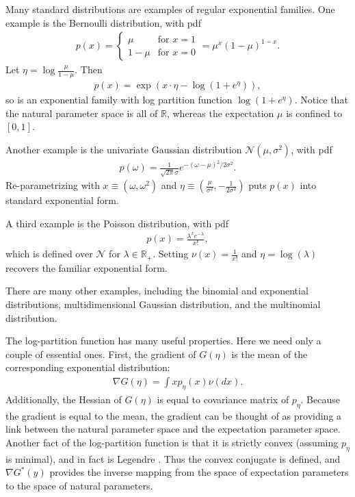 \documentclass{article}
\newcommand{\R}{\mathbb{R}}
\newcommand{\N}{\mathcal{N}}
\begin{document}
Many standard distributions are examples of regular exponential
families.  One example is the Bernoulli distribution, with
pdf 
\begin{align*}
p(x) = \left\{\begin{array}{cc} \mu & \mbox{for }x=1\\
1-\mu & \mbox{for } x=0
\end{array} \right. = \mu^x(1-\mu)^{1-x}.
\end{align*}
Let $\eta = \log\frac{\mu}{1-\mu}$.  Then 
\begin{align*}
p(x) = \exp(x\cdot\eta - \log(1+e^{\eta})),
\end{align*}
so is an exponential family with log partition function
$\log(1+e^{\eta})$.  Notice that the natural parameter space is all of
$\R$, whereas the expectation $\mu$ is confined to $[0,1]$.  

Another example is the univariate Gaussian distribution
$\N(\mu,\sigma^2)$, with pdf 
\begin{align*}
p(\omega) = \frac{1}{\sqrt{2\pi}\sigma}e^{-(\omega-\mu)^2/2\sigma^2}.
\end{align*} 
Re-parametrizing with $x\equiv (\omega,\omega^2)$ and $\eta \equiv
(\frac{\mu}{\sigma^2},-\frac{1}{2\sigma^2})$ puts $p(x)$ into standard
exponential form.  

A third example is the Poisson distribution, with pdf 
\begin{align*}
p(x) = \frac{\lambda^xe^{-\lambda}}{x!},
\end{align*}
which is defined over $\N$ for $\lambda\in\R_+$.  Setting $\nu(x) =
\frac{1}{x!}$ and $\eta = \log(\lambda)$ recovers the familiar
exponential form.  
 
There are many other examples, including the binomial and exponential
distributions, multidimensional Gaussian distribution, and the
multinomial distribution.  

The log-partition function has many useful properties. Here we need
only a couple of essential ones.  First, the gradient of $G(\eta)$
is the mean of the corresponding exponential distribution:
\begin{align*}
\nabla G(\eta) = \int x p_\eta(x) \nu(dx).
\end{align*}
Additionally, the Hessian of $G(\eta)$ is equal to covariance matrix of
$p_\eta$.  Because the gradient is equal to the mean, the gradient can be
thought of as providing a link between the natural parameter space and
the expectation parameter space.  Another fact of the log-partition
function is that it is strictly convex (assuming ${p_\eta}$ is
minimal), and in fact is Legendre \cite{bm.05}.  Thus the convex
conjugate is defined, and $\nabla G^*(y)$ provides the inverse mapping
from the space of expectation parameters to the space of natural
parameters.  
\end{document}
